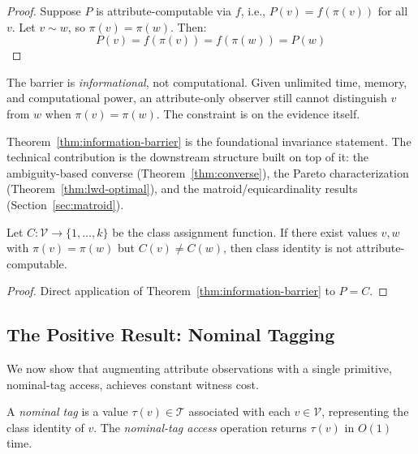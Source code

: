 \begin{proof}
Suppose $P$ is attribute-computable via $f$, i.e., $P(v) = f(\pi(v))$ for all $v$. Let $v \sim w$, so $\pi(v) = \pi(w)$. Then:
\[
P(v) = f(\pi(v)) = f(\pi(w)) = P(w)
\]
\end{proof}

\begin{remark}
The barrier is \emph{informational}, not computational. Given unlimited time, memory, and computational power, an attribute-only observer still cannot distinguish $v$ from $w$ when $\pi(v) = \pi(w)$. The constraint is on the evidence itself.
\end{remark}

\begin{remark}
Theorem~\ref{thm:information-barrier} is the foundational invariance statement. The technical contribution is the downstream structure built on top of it: the ambiguity-based converse (Theorem~\ref{thm:converse}), the Pareto characterization (Theorem~\ref{thm:lwd-optimal}), and the matroid/equicardinality results (Section~\ref{sec:matroid}).
\end{remark}

\begin{corollary}\label{cor:provenance-barrier}
Let $C: \mathcal{V} \to \{1,\ldots,k\}$ be the class assignment function. If there exist values $v, w$ with $\pi(v) = \pi(w)$ but $C(v) \neq C(w)$, then class identity is not attribute-computable.
\end{corollary}

\begin{proof}
Direct application of Theorem~\ref{thm:information-barrier} to $P = C$.
\end{proof}

\subsection{The Positive Result: Nominal Tagging}

We now show that augmenting attribute observations with a single primitive, nominal-tag access, achieves constant witness cost.

\begin{definition}
A \emph{nominal tag} is a value $\tau(v) \in \mathcal{T}$ associated with each $v \in \mathcal{V}$, representing the class identity of $v$. The \emph{nominal-tag access} operation returns $\tau(v)$ in $O(1)$ time.
\end{definition}

